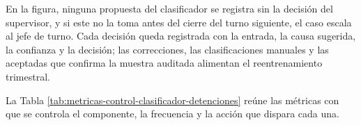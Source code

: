 \documentclass[anexo]{../../comun/overfore}
\begin{document}
En la figura, ninguna propuesta del clasificador se registra sin la decisión del supervisor, y si este no la toma antes del cierre del turno siguiente, el caso escala al jefe de turno. Cada decisión queda registrada con la entrada, la causa sugerida, la confianza y la decisión; las correcciones, las clasificaciones manuales y las aceptadas que confirma la muestra auditada alimentan el reentrenamiento trimestral.

La Tabla \ref{tab:metricas-control-clasificador-detenciones} reúne las métricas con que se controla el componente, la frecuencia y la acción que dispara cada una.
\end{document}
